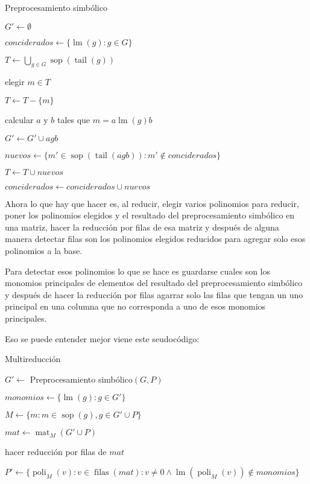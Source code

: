 \documentclass{report}
\theoremstyle{customstyle}
\theoremstyle{factstyle}
\DeclareMathOperator{\sop}{sop}
\DeclareMathOperator{\lm}{lm}
\DeclareMathOperator{\tail}{tail}
\DeclareMathOperator{\mat}{mat}
\DeclareMathOperator{\poli}{poli}
\DeclareMathOperator{\filas}{filas}
\begin{document}
\begin{algorithm}[H] %
  \caption{Preprocesamiento simbólico}\label{alg:Preprocesamiento simbólico}
  $G' ← ∅$

  $conciderados ← \{\lm(g) : g ∈ G\}$

  $T ← ⋃_{g ∈ G} \sop(\tail(g))$

   {
    elegir $m ∈ T$

    $T ← T - \{m\}$

     {
      \If{$\lm(g) | m$} {
        calcular $a$ y $b$ tales que $m = a \lm(g) b$

        $G' ← G' ∪ {agb}$

        $nuevos ← \{m' ∈ \sop(\tail(agb)) : m' ∉ conciderados\}$

        $T ← T ∪ nuevos$

        $conciderados ← conciderados ∪ nuevos$
      }
    }
  }

\end{algorithm}

Ahora lo que hay que hacer es, al reducir, elegir varios polinomios para reducir, poner los polinomios elegidos y el resultado del preprocesamiento simbólico en una matriz, hacer la reducción por filas de esa matriz y después de alguna manera detectar filas son los polinomios elegidos reducidos para agregar solo esos polinomios a la base.

Para detectar esos polinomios lo que se hace es guardarse cuales son los monomios principales de elementos del resultado del preprocesamiento simbólico y después de hacer la reducción por filas agarrar solo las filas que tengan un uno principal en una columna que no corresponda a uno de esos monomios principales.

Eso se puede entender mejor viene este seudocódigo:

\begin{algorithm}[H] %
  \caption{Multireducción}\label{alg:Multireducción}
  $G' ←$ Preprocesamiento simbólico$(G, P)$

  $monomios ← \{\lm(g) : g ∈ G'\}$

  $M ← \{m : m ∈ \sop(g), g ∈ G' ∪ P\}$

  $mat ← \mat_M(G' ∪ P)$

  hacer reducción por filas de $mat$

  $P' ← \{\poli_M(v) : v ∈ \filas(mat) : v ≠ 0 ∧ \lm(\poli_M(v)) ∉ monomios\}$

\end{algorithm}
\end{document}
